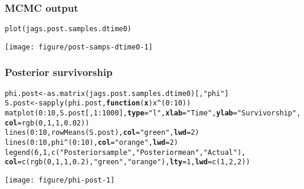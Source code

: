 \documentclass[color=usenames,dvipsnames]{beamer}\usepackage[]{graphicx}\usepackage[]{color}
\makeatletter
\newcommand{\hlnum}[1]{\textcolor[rgb]{0.69,0.494,0}{#1}}%
\newcommand{\hlstr}[1]{\textcolor[rgb]{0.749,0.012,0.012}{#1}}%
\newcommand{\hlopt}[1]{\textcolor[rgb]{0,0,0}{#1}}%
\newcommand{\hlstd}[1]{\textcolor[rgb]{0,0,0}{#1}}%
\newcommand{\hlkwa}[1]{\textcolor[rgb]{0,0,0}{\textbf{#1}}}%
\newcommand{\hlkwb}[1]{\textcolor[rgb]{0,0.341,0.682}{#1}}%
\newcommand{\hlkwc}[1]{\textcolor[rgb]{0,0,0}{\textbf{#1}}}%
\newcommand{\hlkwd}[1]{\textcolor[rgb]{0.004,0.004,0.506}{#1}}%
\newenvironment{kframe}{%
 \def\at@end@of@kframe{}%
 \ifinner\ifhmode%
  \def\at@end@of@kframe{\end{minipage}}%
  \begin{minipage}{\columnwidth}%
 \fi\fi%
 \def\FrameCommand##1{\hskip\@totalleftmargin \hskip-\fboxsep
 \colorbox{shadecolor}{##1}\hskip-\fboxsep
     \hskip-\linewidth \hskip-\@totalleftmargin \hskip\columnwidth}%
 \MakeFramed {\advance\hsize-\width
   \@totalleftmargin\z@ \linewidth\hsize
   \@setminipage}}%
 {\par\unskip\endMakeFramed%
 \at@end@of@kframe}
\newenvironment{knitrout}{}{} %
\makeatother
\begin{document}
\begin{frame}[fragile]
  \frametitle{MCMC output}
\begin{knitrout}
\color{fgcolor}\begin{kframe}
\begin{alltt}
\hlkwd{plot}\hlstd{(jags.post.samples.dtime0)}
\end{alltt}
\end{kframe}

{\centering \texttt{[image: figure/post-samps-dtime0-1]} 

}


\end{knitrout}
\end{frame}




\begin{frame}[fragile]
  \frametitle{Posterior survivorship}
\begin{knitrout}\tiny
{}\color{fgcolor}\begin{kframe}
\begin{alltt}
\hlstd{phi.post} \hlkwb{<-} \hlkwd{as.matrix}\hlstd{(jags.post.samples.dtime0)[,}\hlstr{"phi"}\hlstd{]}
\hlstd{S.post} \hlkwb{<-} \hlkwd{sapply}\hlstd{(phi.post,} \hlkwa{function}\hlstd{(}\hlkwc{x}\hlstd{) x}\hlopt{^}\hlstd{(}\hlnum{0}\hlopt{:}\hlnum{10}\hlstd{))}
\hlkwd{matplot}\hlstd{(}\hlnum{0}\hlopt{:}\hlnum{10}\hlstd{, S.post[,}\hlnum{1}\hlopt{:}\hlnum{1000}\hlstd{],} \hlkwc{type}\hlstd{=}\hlstr{"l"}\hlstd{,} \hlkwc{xlab}\hlstd{=}\hlstr{"Time"}\hlstd{,} \hlkwc{ylab}\hlstd{=}\hlstr{"Survivorship"}\hlstd{,} \hlkwc{col}\hlstd{=}\hlkwd{rgb}\hlstd{(}\hlnum{0}\hlstd{,}\hlnum{1}\hlstd{,}\hlnum{1}\hlstd{,}\hlnum{0.02}\hlstd{))}
\hlkwd{lines}\hlstd{(}\hlnum{0}\hlopt{:}\hlnum{10}\hlstd{,} \hlkwd{rowMeans}\hlstd{(S.post),} \hlkwc{col}\hlstd{=}\hlstr{"green"}\hlstd{,} \hlkwc{lwd}\hlstd{=}\hlnum{2}\hlstd{)}
\hlkwd{lines}\hlstd{(}\hlnum{0}\hlopt{:}\hlnum{10}\hlstd{, phi}\hlopt{^}\hlstd{(}\hlnum{0}\hlopt{:}\hlnum{10}\hlstd{),} \hlkwc{col}\hlstd{=}\hlstr{"orange"}\hlstd{,} \hlkwc{lwd}\hlstd{=}\hlnum{2}\hlstd{)}
\hlkwd{legend}\hlstd{(}\hlnum{6}\hlstd{,} \hlnum{1}\hlstd{,} \hlkwd{c}\hlstd{(}\hlstr{"Posterior sample"}\hlstd{,} \hlstr{"Posterior mean"}\hlstd{,} \hlstr{"Actual"}\hlstd{),}
       \hlkwc{col}\hlstd{=}\hlkwd{c}\hlstd{(}\hlkwd{rgb}\hlstd{(}\hlnum{0}\hlstd{,}\hlnum{1}\hlstd{,}\hlnum{1}\hlstd{,}\hlnum{0.2}\hlstd{),} \hlstr{"green"}\hlstd{,} \hlstr{"orange"}\hlstd{),} \hlkwc{lty}\hlstd{=}\hlnum{1}\hlstd{,} \hlkwc{lwd}\hlstd{=}\hlkwd{c}\hlstd{(}\hlnum{1}\hlstd{,}\hlnum{2}\hlstd{,}\hlnum{2}\hlstd{))}
\end{alltt}
\end{kframe}

{\centering \texttt{[image: figure/phi-post-1]} 

}


\end{knitrout}
\end{frame}
\end{document}
